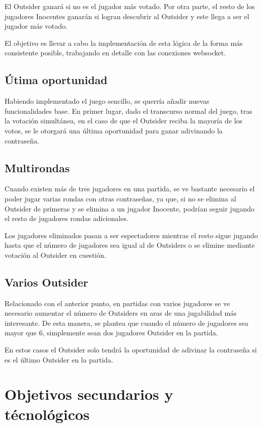 El Outsider ganará si no es el jugador más votado. Por otra parte, el resto de los jugadores Inocentes ganarán
si logran descubrir al Outsider y este llega a ser el jugador más votado.

El objetivo es llevar a cabo la implementación de esta lógica de la forma más consistente posible, trabajando en
detalle con las conexiones websocket.

\subsection{Útima oportunidad}

Habiendo implementado el juego sencillo, se querría añadir nuevas funcionalidades base. En primer lugar, dado el transcurso
normal del juego, tras la votación simultánea, en el caso de que el Outsider reciba la mayoría de los votos, se le otorgará
una última oportunidad para ganar adivinando la contraseña.

\subsection{Multirondas}

Cuando existen más de tres jugadores en una partida, se ve bastante necesario el poder jugar varias rondas con otras contraseñas,
ya que, si no se elimina al Outsider de primeras y se elimina a un jugador Inocente, podrían seguir jugando el resto de jugadores
rondas adicionales.

Los jugadores eliminados pasan a ser espectadores mientras el resto sigue jugando hasta que el número de jugadores sea
igual al de Outsiders o se elimine mediante votación al Outsider en cuestión.

\subsection{Varios Outsider}

Relacionado con el anterior punto, en partidas con varios jugadores se ve necesario aumentar el número de Outsiders en aras de
una jugabilidad más interesante. De esta manera, se plantea que cuando el número de jugadores sea mayor que 6, simplemente sean
dos jugadores Outsider en la partida.

En estos casos el Outsider solo tendrá la oportunidad de adivinar la contraseña si es el último Outsider en la partida.

\section{Objetivos secundarios y técnológicos}

